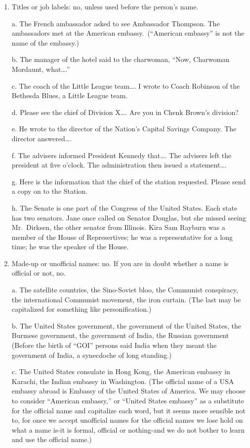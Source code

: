 \documentclass[
    oneside,
    11pt,
]{memoir}
\begin{document}
\begin{enumerate}
  \item Titles or job labels: no, unless used before the person's name.

    a. The French ambassador asked to see Ambassador Thompson. The ambassadors met at the American embassy.\ (\enquote{American embassy} is not the name of the embassy.) 

    b. The manager of the hotel said to the charwoman, \enquote{Now, Charwoman Mordaunt, what\dots.} 

    c. The coach of the Little League team\dots. I wrote to Coach Robinson of the Bethesda Blues, a Little League team.

    d. Please see the chief of Division X\dots. Are you in Chenk Brown's division? 

    e. He wrote to the director of the Nation's Capital Savings Company. The director answered\dots. 

    f. The advisers informed President Kennedy that\dots. The advisers left the president at five o'clock. The administration then issued a statement\dots. 

    g. Here is the information that the chief of the station requested. Please send a copy on to the  Station.

    h. The Senate is one part of the Congress of the United States. Each state has two senators. Jane once called on Senator Douglas, but she missed seeing Mr.\ Dirksen, the other senator from Illinois. Kira Sam Rayburn was a member of the House of Represertives; he was a representative for a long time; he was the speaker of the House.

  \item Made-up or unofficial names: no. If you are in doubt whether a name is official or not, no. 

    a. The satellite countries, the Sino-Soviet bloo, the Communist conspiracy, the international Communist movement, the iron curtain. (The last may be capitalized for something like personification.) 

    b. The United States government, the government of the United States, the Burmese government, the government of India, the Russian government (Before the birth of \enquote{GOI} persons said India when they meant the government of India, a synecdoche of long standing.) 

    c. The United States consulate in Hong Kong, the American embassy in Karachi, the Indian embassy in Washington. (The official name of a USA embassy abroad is Embassy of the United States of America. We may choose to consider \enquote{American embassy,} or \enquote{United States embassy} as a substitute for the official name and capitalize each word, but it seems more sensible not to, for once we accept unofficial names for the official names we lose hold on what a name is-it is formal, official or nothing-and we do not bother to learn and use the official name.)
    \end{enumerate}
\end{document}
